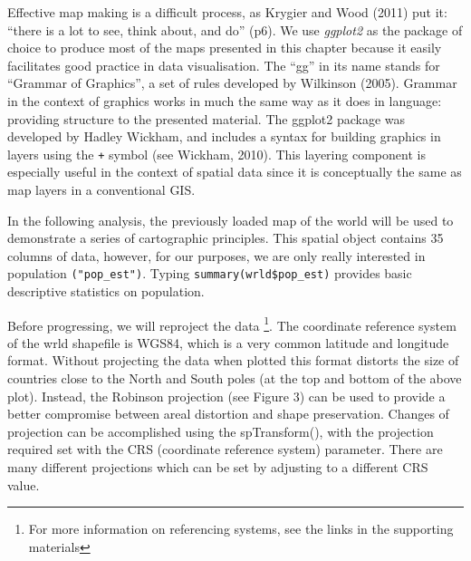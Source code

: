 \documentclass[]{article}
\begin{document}
Effective map making is a difficult process, as Krygier and Wood (2011)
put it: ``there is a lot to see, think about, and do'' (p6). We use \emph{ggplot2} as the package of choice to produce most of the
maps presented in this chapter because it easily facilitates good
practice in data visualisation. The ``gg'' in its name stands for
``Grammar of Graphics'', a set of rules developed by Wilkinson (2005).
Grammar in the context of graphics works in much the same way as it does
in language: providing structure to the presented material. The
ggplot2 package was developed by Hadley Wickham, and includes a syntax for
building graphics in layers using the \texttt{+} symbol (see Wickham,
2010). This layering component is especially useful in the context of
spatial data since it is conceptually the same as map layers in a
conventional GIS.

In the following analysis, the previously loaded map of the world will be used to
demonstrate a series of cartographic principles. This spatial object contains 35
columns of data, however, for our purposes, we are only really interested
in population \texttt{("pop\_est")}. Typing
\texttt{summary(wrld\$pop\_est)} provides basic descriptive statistics
on population.

Before progressing, we will reproject the data \footnote{For more information on referencing systems, see the links in the supporting materials}.
The coordinate reference system of the wrld
shapefile is WGS84, which is a very common latitude and longitude
format. Without projecting the data when plotted this format distorts
the size of countries close to the North and South poles (at the top and
bottom of the above plot). Instead, the
Robinson projection (see Figure 3) can be used to provide a better compromise between areal distortion
and shape preservation. Changes of projection can be accomplished using the spTransform(), with the projection required set with the CRS (coordinate reference system) parameter. 
There are many different projections which can be set by adjusting to a different CRS value. 
\end{document}
